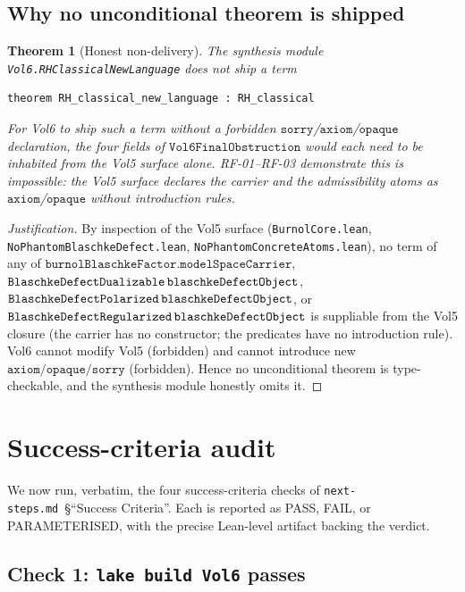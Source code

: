 \documentclass[11pt]{article}
\theoremstyle{plain}
\newtheorem{theorem}{Theorem}[section]
\theoremstyle{definition}
\theoremstyle{remark}
\newcommand{\code}[1]{\texttt{#1}}
\begin{document}
\subsection{Why no unconditional theorem is shipped}

\begin{theorem}[Honest non-delivery]
\label{thm:honest-non-delivery}
The synthesis module \code{Vol6.RHClassicalNewLanguage} \emph{does not}
ship a term

\begin{lstlisting}
theorem RH_classical_new_language : RH_classical
\end{lstlisting}

For Vol6 to ship such a term without a forbidden
\(\code{sorry}\)/\(\code{axiom}\)/\(\code{opaque}\) declaration, the
four fields of \(\code{Vol6FinalObstruction}\) would each need to be
inhabited from the Vol5 surface alone.  RF-01--RF-03 demonstrate this
is impossible: the Vol5 surface declares the carrier and the
admissibility atoms as
\(\code{axiom}\)/\(\code{opaque}\) without introduction rules.
\end{theorem}

\begin{proof}[Justification]
By inspection of the Vol5 surface
(\code{BurnolCore.lean}, \code{NoPhantomBlaschkeDefect.lean},
\code{NoPhantomConcreteAtoms.lean}), no term of any of
\(\code{burnolBlaschkeFactor.modelSpaceCarrier}\),
\(\code{BlaschkeDefectDualizable\,blaschkeDefectObject}\),
\(\code{BlaschkeDefectPolarized\,blaschkeDefectObject}\),
or \(\code{BlaschkeDefectRegularized\,blaschkeDefectObject}\)
is suppliable from the Vol5 closure (the carrier has no
constructor; the predicates have no introduction rule).  Vol6 cannot
modify Vol5 (forbidden) and cannot introduce new
\(\code{axiom}/\code{opaque}/\code{sorry}\) (forbidden).  Hence no
unconditional theorem is type-checkable, and the synthesis module
honestly omits it.
\qedhere
\end{proof}

\section{Success-criteria audit}
\label{sec:audit}

We now run, verbatim, the four success-criteria checks of
\code{next-steps.md}~\S``Success Criteria''.  Each is reported as
PASS, FAIL, or PARAMETERISED, with the precise Lean-level
artifact backing the verdict.

\subsection{Check 1: \texttt{lake build Vol6} passes}
\label{sec:check-1}
\end{document}
